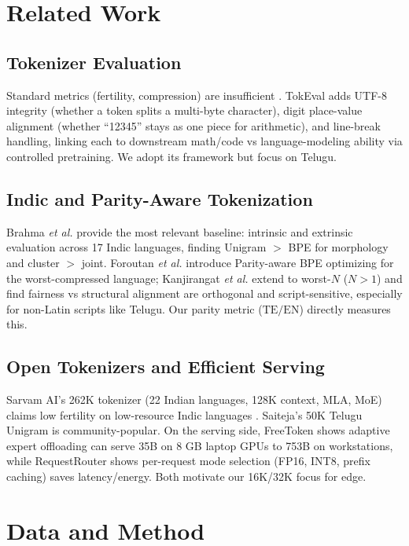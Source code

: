 \documentclass[conference]{IEEEtran}
\begin{document}
\section{Related Work}

\subsection{Tokenizer Evaluation}
Standard metrics (fertility, compression) are insufficient \cite{meister2026tokeval}. TokEval adds UTF-8 integrity (whether a token splits a multi-byte character), digit place-value alignment (whether ``12345'' stays as one piece for arithmetic), and line-break handling, linking each to downstream math/code vs language-modeling ability via controlled pretraining. We adopt its framework but focus on Telugu.

\subsection{Indic and Parity-Aware Tokenization}
Brahma \textit{et al.} \cite{brahma2026indic} provide the most relevant baseline: intrinsic and extrinsic evaluation across 17 Indic languages, finding Unigram $>$ BPE for morphology and cluster $>$ joint. Foroutan \textit{et al.} \cite{foroutan2026parity} introduce Parity-aware BPE optimizing for the worst-compressed language; Kanjirangat \textit{et al.} \cite{kanjirangat2026parity} extend to worst-$N$ ($N>1$) and find fairness vs structural alignment are orthogonal and script-sensitive, especially for non-Latin scripts like Telugu. Our parity metric ($\text{TE}/\text{EN}$) directly measures this.

\subsection{Open Tokenizers and Efficient Serving}
Sarvam AI's 262K tokenizer (22 Indian languages, 128K context, MLA, MoE) claims low fertility on low-resource Indic languages \cite{sarvam105b}. Saiteja's 50K Telugu Unigram is community-popular. On the serving side, FreeToken \cite{freetoken2026} shows adaptive expert offloading can serve 35B on 8 GB laptop GPUs to 753B on workstations, while RequestRouter shows per-request mode selection (FP16, INT8, prefix caching) saves latency/energy. Both motivate our 16K/32K focus for edge.

\section{Data and Method}
\end{document}
